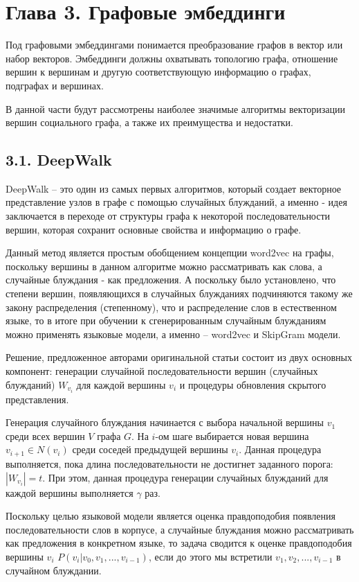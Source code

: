 \section{Глава 3. Графовые эмбеддинги}
Под графовыми эмбеддингами понимается преобразование графов в вектор или набор векторов. Эмбеддинги должны охватывать топологию графа, отношение вершин к вершинам и другую соответствующую информацию о графах, подграфах и вершинах.

В данной части будут рассмотрены наиболее значимые алгоритмы векторизации вершин социального графа, а также их преимущества и недостатки.

\subsection{3.1. DeepWalk}

DeepWalk \cite{DeepWalk} -- это один из самых первых алгоритмов, который создает векторное представление узлов в графе с помощью случайных блужданий, а именно - идея заключается в переходе от структуры графа к некоторой последовательности вершин, которая сохранит основные свойства и информацию о графе. 

Данный метод является простым обобщением концепции word2vec \cite{word2vec} на графы, поскольку вершины в данном алгоритме можно рассматривать как слова, а случайные блуждания - как предложения. А поскольку было установлено, что степени вершин, появляющихся в случайных блужданиях подчиняются такому же закону распределения (степенному), что и распределение слов в естественном языке, то в итоге при обучении к сгенерированным случайным блужданиям можно применять языковые модели, а именно -- word2vec и SkipGram модели.  


Решение, предложенное авторами оригинальной статьи \cite{DeepWalk} состоит
из двух основных компонент: генерации случайной последовательности вершин (случайных блужданий) $W_{v_i}$ для каждой вершины $v_i$ и процедуры обновления скрытого представления.

Генерация случайного блуждания начинается с выбора начальной
вершины $v_1$ среди всех вершин $V$ графа $G$.  На $i$-ом шаге выбирается новая вершина $v_{i+1} \in N(v_i)$ среди соседей предыдущей вершины $v_i$. Данная процедура выполняется, пока длина последовательности
не достигнет заданного порога: $|W_{v_i}| = t$. При этом, данная процедура генерации случайных блужданий для каждой вершины выполняется $\gamma$ раз.

Поскольку целью языковой модели является оценка правдоподобия появления последовательности слов в корпусе, а случайные блуждания можно рассматривать как предложения в конкретном языке, то задача сводится к оценке правдоподобия вершины $v_i$ $P(v_i| v_0, v_1, ..., v_{i-1})$, если до этого мы встретили  $v_1, v_2, ..., v_{i-1}$ в случайном блуждании.

